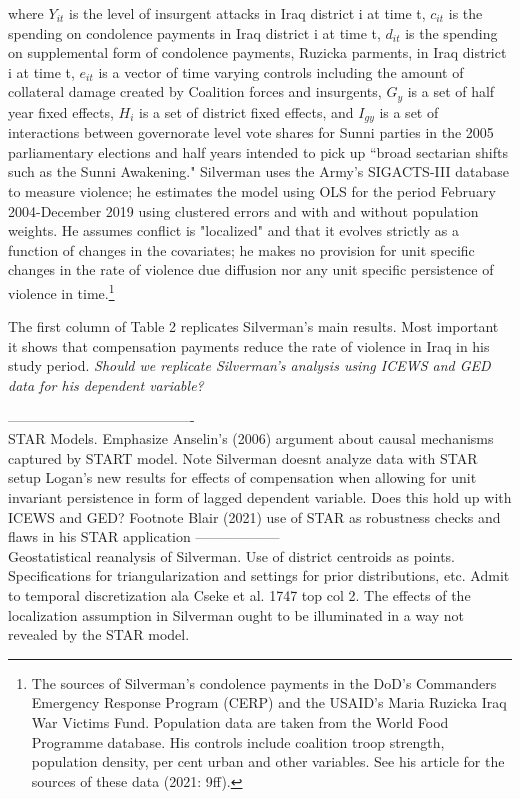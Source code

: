 \documentclass[12pt]{article}
\begin{document}
where $Y_{it}$ is the level of insurgent attacks in Iraq district i at time t, $c_{it}$
is the spending on condolence payments in Iraq district i at time t, $d_{it}$ is the
spending on supplemental form of condolence payments, Ruzicka parments, in Iraq district
i at time t, $e_{it}$ is a vector of time varying controls including the amount of collateral
damage created by Coalition forces and insurgents, $G_y$ is a set of half year fixed effects,
$H_i$ is a set of district fixed effects, and $I_{gy}$ is a set of interactions between
governorate level vote shares for Sunni parties  in the 2005 parliamentary elections and
half years intended to pick up ``broad sectarian shifts such as the Sunni Awakening."
Silverman uses the Army's SIGACTS-III database to measure violence; he estimates the
model using OLS for the period February 2004-December 2019 using clustered errors
and with and without population weights. He assumes conflict is "localized" and that
it evolves strictly as a function of changes in the covariates; he makes no
provision for unit specific changes in the rate of violence due diffusion
nor any unit specific persistence of violence in time.\footnote{The sources of Silverman's
condolence payments in the DoD's Commanders Emergency Response Program (CERP) and
the USAID's Maria Ruzicka Iraq War Victims Fund. Population data are taken from the
World Food Programme database. His controls include coalition troop strength,
population density, per cent urban and other variables. See his article for
the sources of these data (2021: 9ff).}

The first column of Table 2 replicates Silverman's main results. Most important
it shows that compensation payments reduce the rate of violence in Iraq in his
study period. \emph{Should we replicate Silverman's analysis using ICEWS and
GED data for his dependent variable?}

----------------------------------------\\
STAR Models. Emphasize Anselin's (2006) argument about causal mechanisms
captured by START model. Note Silverman doesnt analyze data with STAR setup
 Logan's new results for effects of compensation when allowing for unit invariant
 persistence in form of lagged dependent variable. Does this hold up with ICEWS
 and GED? Footnote Blair (2021) use of STAR as robustness checks and flaws
 in his STAR application
 ------------------\\

Geostatistical reanalysis of Silverman. Use of district centroids as points.
Specifications for triangularization and settings for prior distributions, etc.
Admit to temporal discretization ala Cseke et al. 1747 top col 2.
The effects of the localization assumption in Silverman ought to be illuminated
in a way not revealed by the STAR model.
\end{document}
